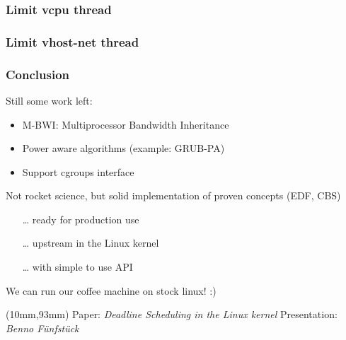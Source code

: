 \documentclass[aspectratio=1610,xcolor=svgnames]{beamer}
\begin{document}
\begin{frame}\frametitle{Limit vcpu thread}
  \begin{center}
    
  \end{center}
\end{frame}

\begin{frame}\frametitle{Limit vhost-net thread}
  \begin{center}
    
  \end{center}
\end{frame}

\begin{frame}
  \frametitle{Conclusion} 
    Still some work left:
    \begin{itemize} 
      \item M-BWI: Multiprocessor Bandwidth Inheritance
      \item Power aware algorithms (example: GRUB-PA)
      \item Support cgroups interface
    \end{itemize}

    Not rocket science, but solid implementation of proven concepts (EDF, CBS)
    \begin{itemize}
      \item[\ldots] ready for production use
      \item[\ldots] upstream in the Linux kernel
      \item[\ldots] with simple to use API
    \end{itemize}

    We can run our coffee machine on stock linux! :)
      
  \begin{textblock*}{15cm}(10mm,93mm)
    \footnotesize{Paper: \textit{Deadline Scheduling in the Linux kernel}\hspace{1cm}
      Presentation: \textit{Benno Fünfstück}}
  \end{textblock*}
\end{frame}
\end{document}
